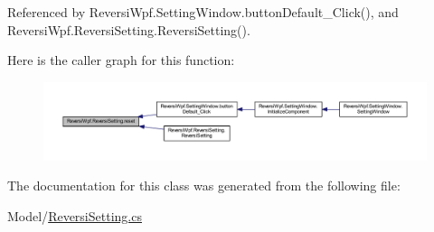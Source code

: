 Referenced by Reversi\+Wpf.\+Setting\+Window.\+button\+Default\+\_\+\+Click(), and Reversi\+Wpf.\+Reversi\+Setting.\+Reversi\+Setting().

Here is the caller graph for this function\+:\nopagebreak
\begin{figure}[H]
\begin{center}
\leavevmode
\includegraphics[width=350pt]{class_reversi_wpf_1_1_reversi_setting_abfa8cacbb6a45668ed099a9a8360bdff_icgraph}
\end{center}
\end{figure}


The documentation for this class was generated from the following file\+:\begin{DoxyCompactItemize}
\item 
Model/\hyperlink{_reversi_setting_8cs}{Reversi\+Setting.\+cs}\end{DoxyCompactItemize}
